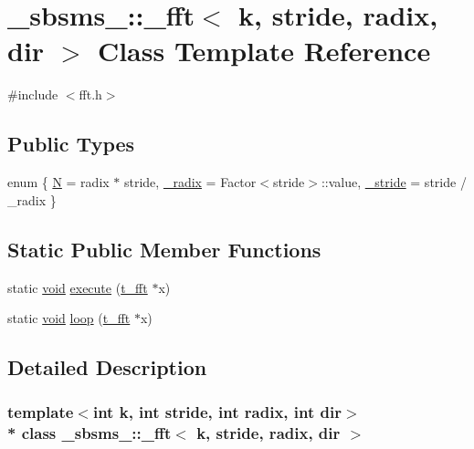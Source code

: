 \hypertarget{class__sbsms___1_1__fft}{}\section{\+\_\+sbsms\+\_\+\+:\+:\+\_\+fft$<$ k, stride, radix, dir $>$ Class Template Reference}
\label{class__sbsms___1_1__fft}


{\ttfamily \#include $<$fft.\+h$>$}

\subsection*{Public Types}
\begin{DoxyCompactItemize}
\item 
enum \{ \hyperlink{class__sbsms___1_1__fft_ac988bcf7cd717245caa9a824697ca8bca7a430ddde1867a675c1f992190238ecf}{N} = radix $\ast$ stride, 
\hyperlink{class__sbsms___1_1__fft_ac988bcf7cd717245caa9a824697ca8bca8e946292315522014b41873dd734511e}{\+\_\+radix} = Factor$<$stride$>$\+:\+:value, 
\hyperlink{class__sbsms___1_1__fft_ac988bcf7cd717245caa9a824697ca8bca9378fa5d6bae901122e2b9d4b6129f40}{\+\_\+stride} = stride / \+\_\+radix
 \}
\end{DoxyCompactItemize}
\subsection*{Static Public Member Functions}
\begin{DoxyCompactItemize}
\item 
static \hyperlink{sound_8c_ae35f5844602719cf66324f4de2a658b3}{void} \hyperlink{class__sbsms___1_1__fft_ac70d29a1a6e3c0124ba4b6b9fbd13d2c}{execute} (\hyperlink{namespace__sbsms___af5c6f976b2da21c36853e3b0c5995a54}{t\+\_\+fft} $\ast$x)
\item 
static \hyperlink{sound_8c_ae35f5844602719cf66324f4de2a658b3}{void} \hyperlink{class__sbsms___1_1__fft_aab4308de1652c1b65d5fb7cb4e96af91}{loop} (\hyperlink{namespace__sbsms___af5c6f976b2da21c36853e3b0c5995a54}{t\+\_\+fft} $\ast$x)
\end{DoxyCompactItemize}


\subsection{Detailed Description}
\subsubsection*{template$<$int k, int stride, int radix, int dir$>$\\*
class \+\_\+sbsms\+\_\+\+::\+\_\+fft$<$ k, stride, radix, dir $>$}



